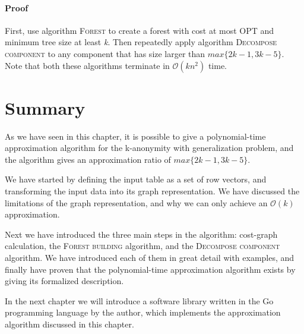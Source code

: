 \paragraph{Proof} First, use algorithm \textsc{Forest} to create a forest with cost at most OPT and minimum tree size at least \textit{k}. Then repeatedly apply algorithm \textsc{Decompose component} to any component that has size larger than \(max\{2k-1, 3k-5\}\). Note that both these algorithms terminate in \(\mathcal{O}(kn^2)\) time. \cite{aggarwal}

\section{Summary}

As we have seen in this chapter, it is possible to give a polynomial-time approximation algorithm for the k-anonymity with generalization problem, and the algorithm gives an approximation ratio of \(max\{2k-1, 3k-5\}\).

We have started by defining the input table as a set of row vectors, and transforming the input data into its graph representation. We have discussed the limitations of the graph representation, and why we can only achieve an \(\mathcal{O}(k)\) approximation.

Next we have introduced the three main steps in the algorithm: cost-graph calculation, the \textsc{Forest building} algorithm, and the \textsc{Decompose component} algorithm. We have introduced each of them in great detail with examples, and finally have proven that the polynomial-time approximation algorithm exists by giving its formalized description.

In the next chapter we will introduce a software library written in the Go programming language by the author, which implements the approximation algorithm discussed in this chapter.